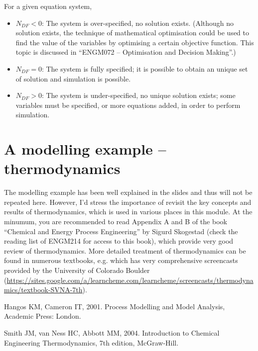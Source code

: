 \documentclass[a4paper,11pt]{article}
\theoremstyle{definition}
\begin{document}
For a given equation system,
\begin{itemize}
	\item $N_{DF}<0$: The system is over-specified, no solution exists. (Although no solution exists,
		the technique of mathematical optimisation could be used to find the value of the variables
		by optimising a certain objective function. This topic is discussed in ``ENGM072 -- Optimisation and Decision Making''.)
	\item $N_{DF}=0$: The system is fully specified; it is possible to obtain an unique set of solution and simulation is possible.
	\item $N_{DF}>0$: The system is under-specified, no unique solution exists; some variables must be specified,
		or more equations added, in order to perform simulation.
\end{itemize}

\section{A modelling example -- thermodynamics}

The modelling example has been well explained in the slides and thus will not be repeated here.
However, I'd stress the importance of revisit the key concepts and results of thermodynamics,
which is used in various places in this module.
At the minumum, you are recommended to read Appendix A and B of the book ``Chemical and Energy Process Engineering'' by Sigurd Skogestad
(check the reading list of ENGM214 for access to this book), which provide very good review of thermodynamics.
More detailed treatment of thermodynamics can be found in numerous textbooks, e.g. \citep{Smith2004} which has
very comprehensive screencasts provided by the University of Colorado Boulder 
(\url{https://sites.google.com/a/learncheme.com/learncheme/screencasts/thermodynamics/textbook-SVNA-7th}).


\begin{thebibliography}{2}
\vspace{-0.4cm}
	Hangos KM, Cameron IT, 2001. Process Modelling and Model Analysis, Academic Press: London.

	Smith JM, van Ness HC, Abbott MM, 2004. Introduction to Chemical Engineering Thermodynamics, 7th edition, McGraw-Hill.
\end{thebibliography}
\end{document}
